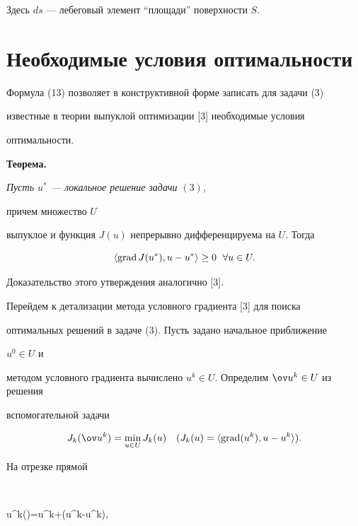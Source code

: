 Здесь $ds$ --- лебеговый элемент ``площади'' поверхности $S$.





\section{Необходимые условия оптимальности}





Формула (13) позволяет в конструктивной форме записать для задачи (3) 


известные в теории выпуклой оптимизации [3] необходимые условия 


оптимальности.


\medskip





{\bf Теорема.} {\it Пусть $u^*$ --- локальное решение задачи $(3)$,


причем множество $U$


выпуклое и функция $J(u)$ непрерывно дифференцируема на $U$. Тогда}


$$


\langle \grad J(u^*),u-u^*\rangle\ge0\ \; \forall u\in U.


$$





Доказательство этого утверждения аналогично [3].





Перейдем к детализации метода условного градиента [3] для поиска


оптимальных решений в задаче (3). Пусть задано начальное приближение 


$u^0\in U$ и


методом условного градиента вычислено $u^k\in U$. Определим $\ov u^k\in 


U$ из решения 


вспомогательной задачи


$$


J_k(\ov u^k)=\min_{u\in U}J_k(u)\quad


(J_k(u)=\langle \grad(u^k),u-u^k \rangle).


$$


На отрезке прямой


$$


u^k(\alpha)=u^k+\alpha(\ov u^k-u^k),\quad


